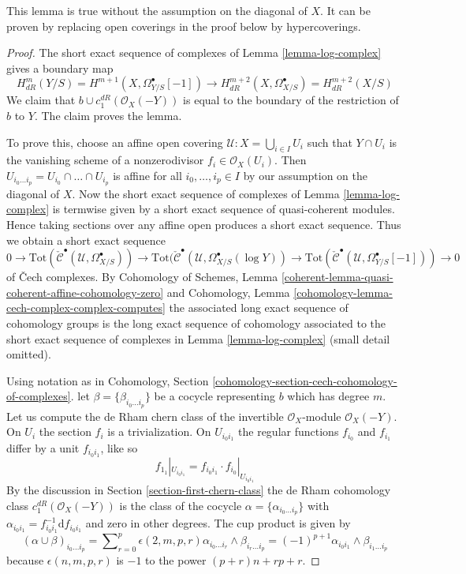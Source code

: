 \noindent
This lemma is true without the assumption on the diagonal of $X$.
It can be proven by replacing open coverings in the proof below
by hypercoverings.

\begin{proof}
The short exact sequence of complexes of Lemma \ref{lemma-log-complex}
gives a boundary map
$$
H^m_{dR}(Y/S) =
H^{m + 1}(X, \Omega^\bullet_{Y/S}[-1]) \to
H^{m + 2}_{dR}(X, \Omega^\bullet_{X/S}) = H^{m + 2}_{dR}(X/S)
$$
We claim that $b \cup c_1^{dR}(\mathcal{O}_X(-Y))$ is equal to
the boundary of the restriction of $b$ to $Y$. The claim proves the lemma.

\medskip\noindent
To prove this, choose an affine open covering
$\mathcal{U} : X = \bigcup_{i \in I} U_i$ such that
$Y \cap U_i$ is the vanishing scheme of a nonzerodivisor
$f_i \in \mathcal{O}_X(U_i)$.
Then $U_{i_0 \ldots i_p} = U_{i_0} \cap \ldots \cap U_{i_p}$
is affine for all $i_0, \ldots, i_p \in I$ by our assumption on
the diagonal of $X$. Now the short exact sequence of complexes of
Lemma \ref{lemma-log-complex}
is termwise given by a short exact sequence of quasi-coherent modules.
Hence taking sections over any affine open produces a short exact
sequence. Thus we obtain a short exact sequence
$$
0 \to
\text{Tot}(\check{\mathcal{C}}^\bullet(\mathcal{U}, \Omega_{X/S}^\bullet)) \to
\text{Tot}(\check{\mathcal{C}}^\bullet(\mathcal{U},
\Omega_{X/S}^\bullet(\log Y)) \to
\text{Tot}(\check{\mathcal{C}}^\bullet(\mathcal{U}, \Omega_{Y/S}^\bullet[-1]))
\to 0
$$
of {\v C}ech complexes. By Cohomology of Schemes, Lemma
\ref{coherent-lemma-quasi-coherent-affine-cohomology-zero} and
Cohomology, Lemma
\ref{cohomology-lemma-cech-complex-complex-computes}
the associated long exact sequence of cohomology groups is the
long exact sequence of cohomology associated to the short exact
sequence of complexes in Lemma \ref{lemma-log-complex}
(small detail omitted).

\medskip\noindent
Using notation as in
Cohomology, Section \ref{cohomology-section-cech-cohomology-of-complexes}.
let $\beta = \{\beta_{i_0 \ldots i_p}\}$ be a cocycle representing $b$
which has degree $m$.
Let us compute the de Rham chern class of the invertible $\mathcal{O}_X$-module
$\mathcal{O}_X(-Y)$. On $U_i$ the section $f_i$ is a trivialization.
On $U_{i_0i_1}$ the regular functions $f_{i_0}$ and $f_{i_1}$
differ by a unit $f_{i_0i_1}$, like so
$$
f_{1_1}|_{U_{i_0i_1}} = f_{i_0i_1} \cdot f_{i_0}|_{U_{i_0i_1}}
$$
By the discussion in Section \ref{section-first-chern-class}
the de Rham cohomology class $c_1^{dR}(\mathcal{O}_X(-Y))$
is the class of the cocycle $\alpha = \{\alpha_{i_0 \ldots i_p}\}$
with $\alpha_{i_0i_1} = f_{i_0i_1}^{-1} \text{d}f_{i_0i_1}$
and zero in other degrees. The cup product is given by
$$
(\alpha \cup \beta)_{i_0 \ldots i_p} =
\sum\nolimits_{r = 0}^p
\epsilon(2, m, p, r)
\alpha_{i_0 \ldots i_r} \wedge \beta_{i_r \ldots i_p} =
(-1)^{p + 1} \alpha_{i_0i_1} \wedge \beta_{i_1 \ldots i_p}
$$
because $\epsilon(n, m, p, r)$ is $-1$ to the power
$(p + r)n + rp + r$.


\end{proof}
